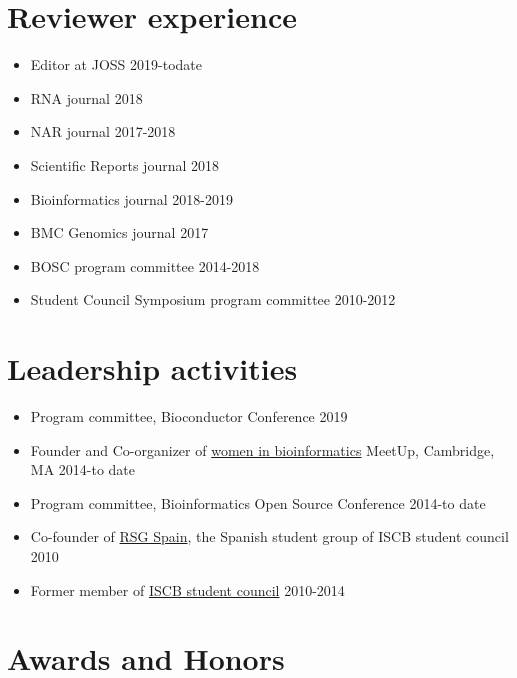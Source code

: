 \hypertarget{reviewer-experience}{%
\section{Reviewer experience}\label{reviewer-experience}}

\begin{itemize}
\tightlist
\item Editor at JOSS \hfill 2019-todate
\item
  RNA journal \hfill 2018
\item
  NAR journal \hfill 2017-2018
\item
  Scientific Reports journal \hfill 2018
\item
  Bioinformatics journal \hfill 2018-2019
\item
  BMC Genomics journal \hfill 2017
\item
  BOSC program committee \hfill 2014-2018
\item
  Student Council Symposium program committee \hfill 2010-2012
\end{itemize}

\hypertarget{leadership-activities}{%
\section{Leadership activities}\label{leadership-activities}}

\begin{itemize}
\tightlist
\item
  Program committee, Bioconductor Conference \hfill 2019
\item
  Founder and Co-organizer of
  \href{https://www.meetup.com/Cambridge-woman-developers-in-bioinformatics/}{women
  in bioinformatics} MeetUp, Cambridge, MA \hfill 2014-to date
\item
  Program committee, Bioinformatics Open Source Conference \hfill 2014-to date
\item
  Co-founder of \href{http://www.rsgspain.org}{RSG Spain}, the Spanish
  student group of ISCB student council \hfill 2010
\item
  Former member of \href{http://www.iscbsc.org}{ISCB student council} \hfill 2010-2014
\end{itemize}

\hypertarget{awards-honors}{%
\section{Awards and Honors}\label{awards-honors}}

